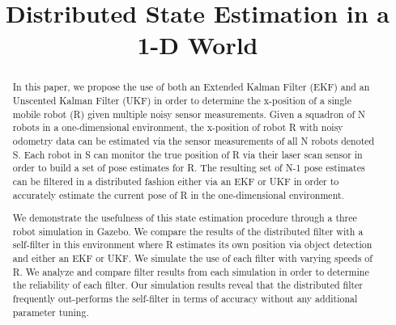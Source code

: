 \documentclass[conference]{IEEEtran}
\begin{document}
\title{Distributed State Estimation in a 1-D World}


\author{
}

\maketitle

\begin{abstract}
In this paper, we propose the use of both an Extended Kalman Filter (EKF) and an Unscented Kalman Filter (UKF) in order 
to determine the x-position of a single mobile robot (R) given multiple noisy sensor measurements. Given a squadron of 
N robots in a one-dimensional environment, the x-position of robot R with noisy odometry data can be estimated via the 
sensor measurements of all N robots denoted S. Each robot in S can monitor the true position of R via their laser scan 
sensor in order to build a set of pose estimates for R. The resulting set of N-1 pose estimates can be filtered in a 
distributed fashion either via an EKF or UKF in order to accurately estimate the current pose of R in the 
one-dimensional environment.

We demonstrate the usefulness of this state estimation procedure through a three robot simulation in Gazebo. We compare 
the results of the distributed filter with a self-filter in this environment where R estimates its own position via 
object detection and either an EKF or UKF. We simulate the use of each filter with varying speeds of R. We analyze and 
compare filter results from each simulation in order to determine the reliability of each filter. Our simulation 
results reveal that the distributed filter frequently out-performs the self-filter in terms of accuracy without any 
additional parameter tuning.
\end{abstract}
\end{document}
